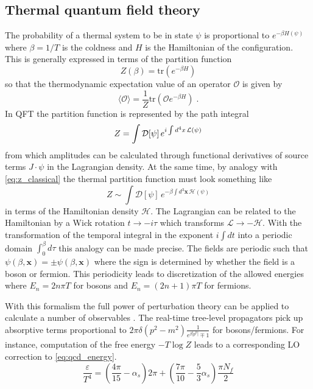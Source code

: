\subsection{Thermal quantum field theory}
The probability of a thermal system to be in state $\psi$ is proportional to $e^{-\beta H(\psi)}$ where $\beta = 1/T$ is the coldness and $H$ is the Hamiltonian of the configuration.
This is generally expressed in terms of the partition function
\begin{equation}
  \label{eq:z_classical}
Z(\beta) = \mathrm{tr} \left( e^{-\beta H} \right)
\end{equation}
so that the thermodynamic expectation value of an operator $\mathcal{O}$ is given by
\begin{equation}
\langle \mathcal{O} \rangle = \frac{1}{Z} \mathrm{tr} \left( \mathcal{O} e^{-\beta H} \right) \;.
\end{equation}
In \ac{QFT} the partition function is represented by the path integral
\begin{equation}
  \label{eq:z_qft}
  Z = \int \mathcal{D}[\psi] \, e^{i\int d^4 x \, \mathcal{L}(\psi)}
\end{equation}
from which amplitudes can be calculated through functional derivatives of source terms $J \cdot \psi$ in the Lagrangian density.
At the same time, by analogy with \cref{eq:z_classical} the thermal partition function must look something like
\begin{equation}
  \label{eq:z_analogy}
Z \sim \int \mathcal{D}[\psi] \, e^{-\beta \int d^3 \mathbf{x} \, \mathcal{H}(\psi)}
\end{equation}
in terms of the Hamiltonian density $\mathcal{H}$.
The Lagrangian can be related to the Hamiltonian by a Wick rotation $t \rightarrow -i\tau$ which transforms $\mathcal{L} \rightarrow - \mathcal{H}$.
With the transformation of the temporal integral in the exponent $i \int dt$ into a periodic domain $\int_0^\beta d\tau$ this analogy can be made precise.
The fields are periodic such that \(\psi(\beta,\mathbf{x}) = \pm \psi(\beta,\mathbf{x})\) where the sign is determined by whether the field is a boson or fermion.
This periodicity leads to discretization of the allowed energies where $E_n = 2n\pi T$ for bosons and $E_n = (2n+1)\pi T$ for fermions.

With this formalism the full power of perturbation theory can be applied to calculate a number of observables \cite{Gross:1980br}.
The real-time tree-level propagators pick up absorptive terms proportional to \(2\pi \delta(p^2 - m^2) \frac{1}{e^{\beta |p^0|} \mp 1} \) for bosons/fermions.
For instance, computation of the free energy $ -T \log Z$ leads to a corresponding \ac{LO} correction to \cref{eq:qcd_energy}.
\begin{equation}
  \label{eq:qcd_energy_lo}
\frac{\varepsilon}{T^4} = \left( \frac{4\pi}{15} - \alpha_s \right)2\pi + \left(\frac{7\pi}{10} - \frac{5}{3}\alpha_s \right)\frac{\pi N_f}{2}
\end{equation}


